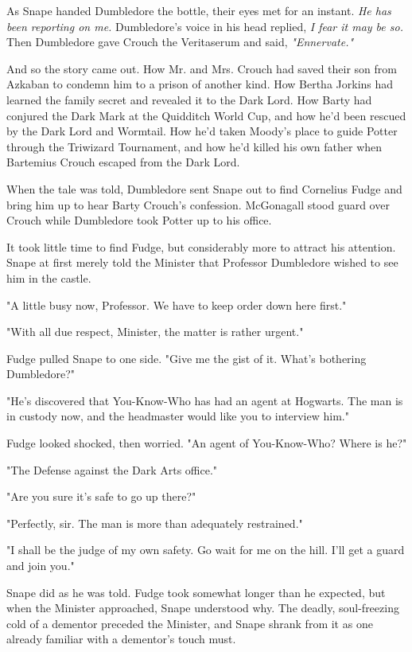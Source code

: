 As Snape handed Dumbledore the bottle, their eyes met for an instant. \emph{He has been reporting on me.} Dumbledore's voice in his head replied, \emph{I fear it may be so.} Then Dumbledore gave Crouch the Veritaserum and said, \emph{"Ennervate."}

And so the story came out. How Mr. and Mrs. Crouch had saved their son from Azkaban to condemn him to a prison of another kind. How Bertha Jorkins had learned the family secret and revealed it to the Dark Lord. How Barty had conjured the Dark Mark at the Quidditch World Cup, and how he'd been rescued by the Dark Lord and Wormtail. How he'd taken Moody's place to guide Potter through the Triwizard Tournament, and how he'd killed his own father when Bartemius Crouch escaped from the Dark Lord.

When the tale was told, Dumbledore sent Snape out to find Cornelius Fudge and bring him up to hear Barty Crouch's confession. McGonagall stood guard over Crouch while Dumbledore took Potter up to his office.

It took little time to find Fudge, but considerably more to attract his attention. Snape at first merely told the Minister that Professor Dumbledore wished to see him in the castle.

"A little busy now, Professor. We have to keep order down here first."

"With all due respect, Minister, the matter is rather urgent."

Fudge pulled Snape to one side. "Give me the gist of it. What's bothering Dumbledore?"

"He's discovered that You-Know-Who has had an agent at Hogwarts. The man is in custody now, and the headmaster would like you to interview him."

Fudge looked shocked, then worried. "An agent of You-Know-Who? Where is he?"

"The Defense against the Dark Arts office."

"Are you sure it's safe to go up there?"

"Perfectly, sir. The man is more than adequately restrained."

"I shall be the judge of my own safety. Go wait for me on the hill. I'll get a guard and join you."

Snape did as he was told. Fudge took somewhat longer than he expected, but when the Minister approached, Snape understood why. The deadly, soul-freezing cold of a dementor preceded the Minister, and Snape shrank from it as one already familiar with a dementor's touch must.

